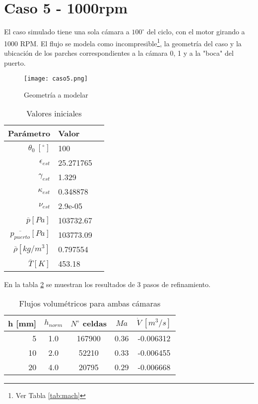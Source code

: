 \section{Caso 5 - 1000rpm}

El caso simulado tiene una sola cámara a $100^{\circ}$ del ciclo, con el motor
girando a 1000 RPM.
%
El flujo se modela como incompresible\footnote{Ver Tabla \ref{tab:mach}}, la
geometría del caso y la ubicación de los parches correspondientes a la cámara
0, 1 y a la "boca" del puerto.

\begin{figure}
    \centering
    \texttt{[image: caso5.png]}
    \caption{Geometría a modelar}
    \label{fig:caso5}
\end{figure}

\begin{table}
    \centering
    \begin{tabular}{rll}\toprule
        Parámetro & Valor \\ \midrule
        $\theta_0\ [^{\circ}]$ & 100 \\
        $\epsilon_{est}$ & 25.271765 \\
        $\gamma_{est}$ & 1.329 \\
        $\kappa_{est}$ & 0.348878 \\
        $\nu_{est}$ & 2.9e-05 \\
        $\overline{p} [Pa]$ & 103732.67 \\
        $\overline{p_{puerto}} [Pa]$ & 103773.09 \\
        $\overline{\rho} [kg/m^3]$ & 0.797554 \\
        $\overline{T} [K]$ & 453.18 \\ \bottomrule
    \end{tabular}
    \caption{Valores iniciales}
    \label{tab:caso5_ci}
\end{table}

En la tabla \ref{tab:res_caso5} se muestran los resultados de 3 pasos de
refinamiento.

\begin{table}[h]
    \centering
    \begin{tabular}{rcccc}\toprule
        h [mm] & $h_{norm}$ & $N^{\circ}$ celdas & $Ma$ & $\dot{V}\ [m^3/s]$ \\ \midrule
        5      & 1.0        & 167900             & 0.36 & -0.006312 \\
        10     & 2.0        & 52210              & 0.33 & -0.006455 \\
        20     & 4.0        & 20795              & 0.29 & -0.006668 \\ \bottomrule
    \end{tabular}
    \caption{Flujos volumétricos para ambas cámaras}
    \label{tab:res_caso5}
\end{table}

